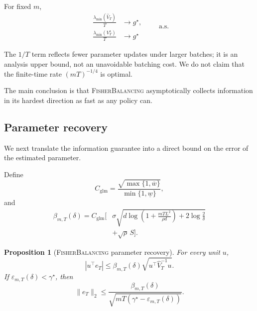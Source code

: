 \documentclass[10pt,twoside,letterpaper]{article}
\newtheorem{proposition}{Proposition}
\newcommand{\norm}[1]{\lVert #1\rVert}
\newcommand{\FB}{\textnormal{\textsc{FisherBalancing}}}
\newcommand{\Vhat}{\widehat V}
\newcommand{\gstar}{g^\star}
\begin{document}
For fixed $m$,
\begin{equation}
\begin{aligned}
\frac{\lambda_{\min}(\Vhat_T)}{T}
&\longrightarrow
\gstar,\\
\frac{\lambda_{\min}(V_T^\star)}{T}
&\longrightarrow
\gstar
\end{aligned}
\qquad
\text{a.s.}
\label{eq:main-limit}
\end{equation}

The $1/T$ term reflects fewer parameter updates under larger batches;
it is an analysis upper bound, not an unavoidable batching cost. We do
not claim that the finite-time rate $(mT)^{-1/4}$ is optimal.

The main conclusion is that \FB{} asymptotically collects information
in its hardest direction as fast as any policy can.


\subsection{Parameter recovery}
\label{sec:confidence}

We next translate the information guarantee into a direct bound on the
error of the estimated parameter.

Define
\begin{equation}
C_{\mathrm{glm}}
=
\frac{
\sqrt{\max\{1,\overline w\}}
}{
\min\{1,\underline w\}
},
\end{equation}
and
\begin{equation}
\begin{split}
\beta_{m,T}(\delta)
=
C_{\mathrm{glm}}
\Bigg[
&
\sigma
\sqrt{
d\log\!\left(
1+\frac{mTL^2}{\rho d}
\right)
+
2\log\frac2\delta
}\\
&+
\sqrt\rho\,S
\Bigg].
\end{split}
\label{eq:confidence-radius}
\end{equation}

\begin{proposition}[\FB{} parameter recovery]
\label{prop:confidence}
For every unit $u$,
\begin{equation}
|u^\top e_T|
\le
\beta_{m,T}(\delta)
\sqrt{
u^\top\Vhat_T^{-1}u
}.
\label{eq:directional-confidence}
\end{equation}
If $\varepsilon_{m,T}(\delta)<\gamma^\star$, then
\begin{equation}
\norm{e_T}_2
\le
\frac{
\beta_{m,T}(\delta)
}{
\sqrt{
mT
\left(
\gamma^\star
-
\varepsilon_{m,T}(\delta)
\right)
}
}.
\label{eq:l2-confidence}
\end{equation}
\end{proposition}
\end{document}
